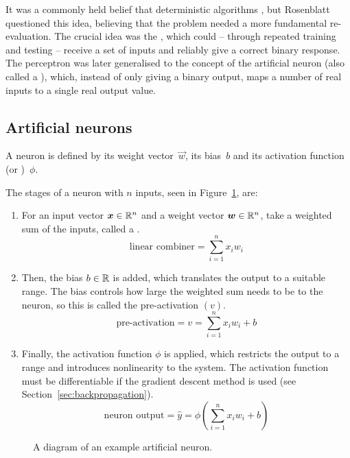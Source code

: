 It was a commonly held belief that deterministic algorithms , but Rosenblatt questioned this idea, believing that the problem needed a more fundamental re-evaluation.
The crucial idea was the , which could -- through repeated training and testing -- receive a set of inputs and reliably give a correct binary response.
The perceptron was later generalised to the concept of the artificial neuron (also called a ), which, instead of only giving a binary output, maps a number of real inputs to a single real output value.

\subsection{Artificial neurons}

A neuron is defined by its weight vector~\(\vec{w}\), its bias~\(b\) and its activation function (or )~\(\phi\).

The stages of a neuron with \(n\) inputs, seen in Figure~\ref{fig:neuron-example}, are:
\begin{enumerate}
	\item For an input vector \(\bm{x} \in \mathbb{R}^n\) and a weight vector \(\bm{w} \in \mathbb{R}^n\), take a weighted sum of the inputs, called a .
	      \[ \text{linear combiner} = \sum_{i=1}^{n}{x_i w_i} \]
	\item Then, the bias \(b \in \mathbb{R}{}\) is added, which translates the output to a suitable range.
	      The bias controls how large the weighted sum needs to be to  the neuron, so this is called the pre-activation \((v)\).
	      \[ \text{pre-activation} = v = \sum_{i=1}^{n}{x_i w_i} + b \]
	\item Finally, the activation function \(\phi\) is applied, which restricts the output to a range and introduces nonlinearity to the system.
	      The activation function must be differentiable if the gradient descent method is used (see Section~\ref{sec:backpropagation}).
	      \[ \text{neuron output} = \hat{y} = \phi\left(\sum_{i=1}^{n}{x_i w_i} + b \right) \]
\end{enumerate}

\begin{figure}[htbp]
	\centering
	
	\caption{A diagram of an example artificial neuron.}
	\label{fig:neuron-example}
\end{figure}

